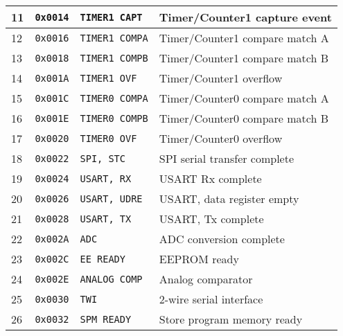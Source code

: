 {\begin{table}[h]
\begin{tabular}{ | m{1.75cm} | m{1.25cm} | m{2.5cm} | m{5cm} | }
      \hline
      11 & \texttt{0x0014} & \texttt{TIMER1 CAPT}
      & Timer/Counter1 capture event \\
      \hline
      12 & \texttt{0x0016} & \texttt{TIMER1 COMPA}
      & Timer/Counter1 compare match A \\
      \hline
      13 & \texttt{0x0018} & \texttt{TIMER1 COMPB}
      & Timer/Counter1 compare match B \\
      \hline
      14 & \texttt{0x001A} & \texttt{TIMER1 OVF}
      & Timer/Counter1 overflow \\
      \hline
      15 & \texttt{0x001C} & \texttt{TIMER0 COMPA}
      & Timer/Counter0 compare match A \\
      \hline
      16 & \texttt{0x001E} & \texttt{TIMER0 COMPB}
      & Timer/Counter0 compare match B \\
      \hline
      17 & \texttt{0x0020} & \texttt{TIMER0 OVF}
      & Timer/Counter0 overflow \\
      \hline
      18 & \texttt{0x0022} & \texttt{SPI, STC}
      & SPI serial transfer complete \\
      \hline
      19 & \texttt{0x0024} & \texttt{USART, RX}
      & USART Rx complete \\
      \hline
      20 & \texttt{0x0026} & \texttt{USART, UDRE}
      & USART, data register empty \\
      \hline
      21 & \texttt{0x0028} & \texttt{USART, TX}
      & USART, Tx complete \\
      \hline
      22 & \texttt{0x002A} & \texttt{ADC}
      & ADC conversion complete \\
      \hline
      23 & \texttt{0x002C} & \texttt{EE READY}
      & EEPROM ready \\
      \hline
      24 & \texttt{0x002E} & \texttt{ANALOG COMP}
      & Analog comparator \\
      \hline
      25 & \texttt{0x0030} & \texttt{TWI}
      & 2-wire serial interface \\
      \hline
      26 & \texttt{0x0032} & \texttt{SPM READY}
      & Store program memory ready \\
      \hline
    \end{tabular}
    \caption{\tableCaption}
    \label{table:mcu-atmega328p-ivt}
  \end{table}
}
